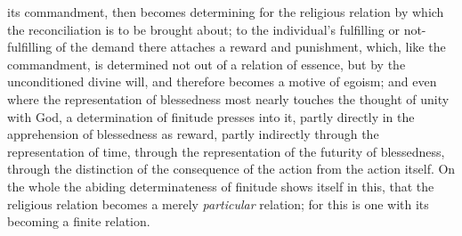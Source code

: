 \documentclass[12pt,a4paper]{book}
\begin{document}
its commandment, then becomes determining for the religious relation by which the
reconciliation is to be brought about; to the individual's fulfilling or
not-fulfilling of the demand there attaches a reward and punishment, which, like
the commandment, is determined not out of a relation of essence, but by the
unconditioned divine will, and therefore becomes a motive of egoism; and even
where the representation of blessedness most nearly touches the thought of unity
with God, a determination of finitude presses into it, partly directly in the
apprehension of blessedness as reward, partly indirectly through the
representation of time, through the representation of the futurity of blessedness,
through the distinction of the consequence of the action from the action itself.
On the whole the abiding determinateness of finitude shows itself in this, that
the religious relation becomes a merely \emph{particular} relation; for this is one with
its becoming a finite relation.
\end{document}
